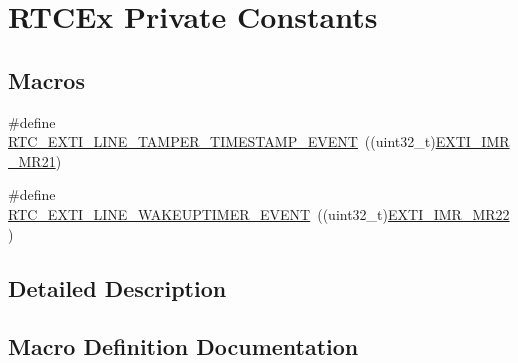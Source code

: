 \hypertarget{group___r_t_c_ex___private___constants}{}\section{R\+T\+C\+Ex Private Constants}
\label{group___r_t_c_ex___private___constants}
\subsection*{Macros}
\begin{DoxyCompactItemize}
\item 
\#define \hyperlink{group___r_t_c_ex___private___constants_gaffa3448885f1dec216899aef7f49471f}{R\+T\+C\+\_\+\+E\+X\+T\+I\+\_\+\+L\+I\+N\+E\+\_\+\+T\+A\+M\+P\+E\+R\+\_\+\+T\+I\+M\+E\+S\+T\+A\+M\+P\+\_\+\+E\+V\+E\+NT}~((uint32\+\_\+t)\hyperlink{group___peripheral___registers___bits___definition_ga3cc7e64c45d273ca7396ac1e0ce38c36}{E\+X\+T\+I\+\_\+\+I\+M\+R\+\_\+\+M\+R21})
\item 
\#define \hyperlink{group___r_t_c_ex___private___constants_ga1a1a58e244663850786c387bfa5474f2}{R\+T\+C\+\_\+\+E\+X\+T\+I\+\_\+\+L\+I\+N\+E\+\_\+\+W\+A\+K\+E\+U\+P\+T\+I\+M\+E\+R\+\_\+\+E\+V\+E\+NT}~((uint32\+\_\+t)\hyperlink{group___peripheral___registers___bits___definition_ga2aec84941d816be18a1607b6ee25acb1}{E\+X\+T\+I\+\_\+\+I\+M\+R\+\_\+\+M\+R22})
\end{DoxyCompactItemize}


\subsection{Detailed Description}


\subsection{Macro Definition Documentation}
\mbox{\label{group___r_t_c_ex___private___constants_gaffa3448885f1dec216899aef7f49471f}} 
